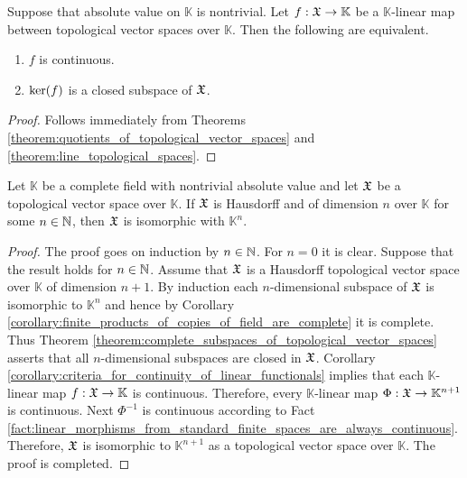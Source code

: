 \begin{corollary}\label{corollary:criteria_for_continuity_of_linear_functionals}
   Suppose that absolute value on $\mathbb{K}$ is nontrivial. Let $f:{\mathfrak X} \rightarrow \mathbb{K}$ be a $\mathbb{K}$-linear map between topological vector spaces over $\mathbb{K}$. Then the following are equivalent.
   \begin{enumerate}[label=\emph{\textbf{(\roman*)}}, leftmargin=*]
      \item $f$ is continuous.
      \item $\mathrm{ker}(f)$ is a closed subspace of ${\mathfrak X}$.
   \end{enumerate}
\end{corollary}
\begin{proof}
   Follows immediately from Theorems \ref{theorem:quotients_of_topological_vector_spaces} and \ref{theorem:line_topological_spaces}.
\end{proof}

\begin{theorem}\label{theorem:uniqueness_of_finite_dimensional_Hausdorff_top_vec_spaces}
   Let $\mathbb{K}$ be a complete field with nontrivial absolute value and let ${\mathfrak X}$ be a topological vector space over $\mathbb{K}$. If ${\mathfrak X}$ is Hausdorff and of dimension $n$ over $\mathbb{K}$ for some $n\in {\mathbb N}$, then ${\mathfrak X}$ is isomorphic with $\mathbb{K}^n$.
\end{theorem}
\begin{proof}
   The proof goes on induction by $n\in {\mathbb N}$. For $n = 0$ it is clear. Suppose that the result holds for $n \in {\mathbb N}$. Assume that ${\mathfrak X}$ is a Hausdorff topological vector space over $\mathbb{K}$ of dimension $n + 1$. By induction each $n$-dimensional subspace of ${\mathfrak X}$ is isomorphic to $\mathbb{K}^n$ and hence by Corollary \ref{corollary:finite_products_of_copies_of_field_are_complete} it is complete. Thus Theorem \ref{theorem:complete_subspaces_of_topological_vector_spaces} asserts that all $n$-dimensional subspaces are closed in ${\mathfrak X}$. Corollary \ref{corollary:criteria_for_continuity_of_linear_functionals} implies that each $\mathbb{K}$-linear map $f:{\mathfrak X}\rightarrow \mathbb{K}$ is continuous. Therefore, every $\mathbb{K}$-linear map $\Phi:{\mathfrak X} \rightarrow \mathbb{K}^{n+1}$ is continuous. Next $\Phi^{-1}$ is continuous according to Fact \ref{fact:linear_morphisms_from_standard_finite_spaces_are_always_continuous}. Therefore, ${\mathfrak X}$ is isomorphic to $\mathbb{K}^{n+1}$ as a topological vector space over $\mathbb{K}$. The proof is completed.
\end{proof}

